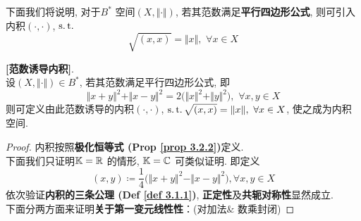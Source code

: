 	\vspace{4em}
	
	下面我们将说明, 对于$B^*$ 空间$(X , \Vert \cdot \Vert)$, 若其范数满足\textbf{平行四边形公式}, 则可引入内积$(\cdot , \cdot)$, $\operatorname{s.t.}$
	\[ \sqrt{(x , x)} = \Vert x \Vert , \,\, \forall x \in X \]
	
	\newpage
	
	\begin{thm}\label{thm 3.2.1}
		\textbf{[范数诱导内积]}. \\
		设$(X , \Vert \cdot \Vert) \in B^*$, 若其范数满足平行四边形公式, 即
		\[ \Vert x + y \Vert^2 + \Vert x - y \Vert^2 = 2 \Big( \Vert x \Vert^2 + \Vert y \Vert^2 \Big) , \,\, \forall x , y \in X \]
		则可定义由此范数诱导的内积$(\cdot , \cdot)$, $\operatorname{s.t.} \sqrt{(x , x)} = \Vert x \Vert , \,\, \forall x \in X$, 使之成为内积空间. 
		
		\vspace{6em}
		
		\begin{proof}
			内积按照\textbf{极化恒等式 (Prop \ref{prop 3.2.2})}定义. \\
			下面我们只证明$\mathbb{K} = \mathbb{R}$ 的情形, $\mathbb{K} = \mathbb{C}$ 可类似证明. 即定义
			\[ (x , y) \coloneqq \frac{1}{4} \Big( \Vert x + y \Vert^2 - \Vert x - y \Vert^2 \Big) , \forall x , y \in X \]
			依次验证\textbf{内积的三条公理 (Def \ref{def 3.1.1})}, \textbf{正定性}及\textbf{共轭对称性}显然成立. \\ 
			下面分两方面来证明\textbf{关于第一变元线性性}：(对加法$\&$ 数乘封闭) 
			
			\vspace{1em}
			

\end{proof}
\end{thm}
